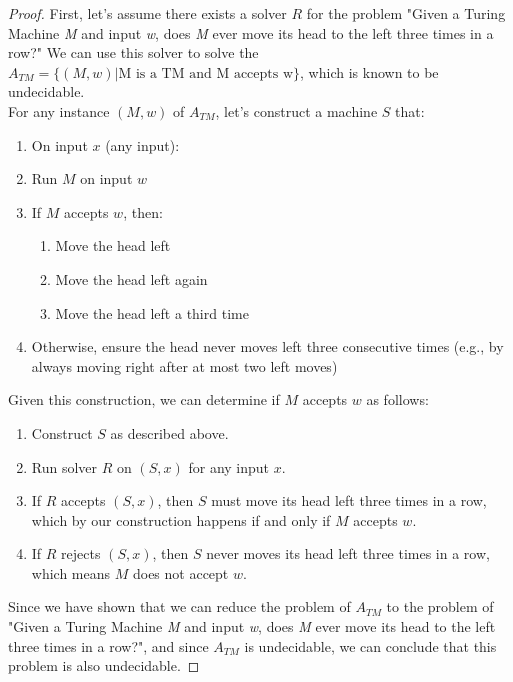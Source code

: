 \documentclass{article}
\begin{document}
\begin{proof}
    First, let's assume there exists a solver $R$ for the problem "Given a Turing Machine \emph{M} and input \emph{w}, does \emph{M} ever move its head to the left three times in a row?" We can use this solver to solve the $A_{TM} = \{(M,w) | \text{M is a TM and M accepts w}\}$, which is known to be undecidable.\\

    For any instance $(M,w)$ of $A_{TM}$, let's construct a machine $S$ that:
    \begin{enumerate}
        \item[] On input $x$ (any input):
        \item Run $M$ on input $w$
        \item If $M$ accepts $w$, then:
           \begin{enumerate}
               \item Move the head left
               \item Move the head left again
               \item Move the head left a third time
           \end{enumerate}
        \item Otherwise, ensure the head never moves left three consecutive times (e.g., by always moving right after at most two left moves)
    \end{enumerate}

    Given this construction, we can determine if $M$ accepts $w$ as follows:
    \begin{enumerate}
        \item Construct $S$ as described above.
        \item Run solver $R$ on $(S,x)$ for any input $x$.
        \item If $R$ accepts $(S,x)$, then $S$ must move its head left three times in a row, which by our construction happens if and only if $M$ accepts $w$.
        \item If $R$ rejects $(S,x)$, then $S$ never moves its head left three times in a row, which means $M$ does not accept $w$.
    \end{enumerate}

    Since we have shown that we can reduce the problem of $A_{TM}$ to the problem of "Given a Turing Machine \emph{M} and input \emph{w}, does \emph{M} ever move its head to the left three times in a row?", and since $A_{TM}$ is undecidable, we can conclude that this problem is also undecidable.
\end{proof}
\end{document}
